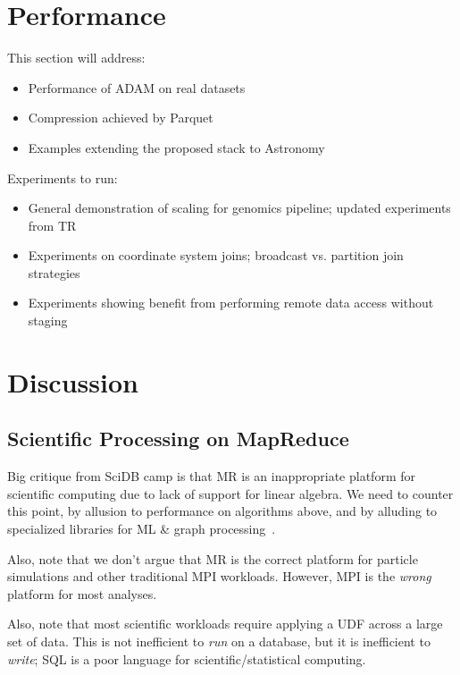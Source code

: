 \documentclass{acm_proc_article-sp}
\begin{document}
\section{Performance}
\label{sec:performance}

This section will address:

\begin{itemize}
\item Performance of ADAM on real datasets
\item Compression achieved by Parquet
\item Examples extending the proposed stack to Astronomy
\end{itemize}

Experiments to run:

\begin{itemize}
\item General demonstration of scaling for genomics pipeline; updated experiments from TR
\item Experiments on coordinate system joins; broadcast vs. partition join strategies
\item Experiments showing benefit from performing remote data access without staging
\end{itemize}

\section{Discussion}
\label{sec:discussion}

\subsection{Scientific Processing on MapReduce}
\label{sec:scientific-compute-mr}

Big critique from SciDB camp is that MR is an inappropriate platform for scientific computing due to
lack of support for linear algebra. We need to counter this point, by allusion to performance on
algorithms above, and by alluding to specialized libraries for ML \& graph processing~\cite{sparks13,
xin13}.

Also, note that we don't argue that MR is the correct platform for particle simulations and other
traditional MPI workloads. However, MPI is the \emph{wrong} platform for most analyses.

Also, note that most scientific workloads require applying a UDF across a large set of data. This is not
inefficient to \emph{run} on a database, but it is inefficient to \emph{write}; SQL is a poor language for
scientific/statistical computing.
\end{document}
